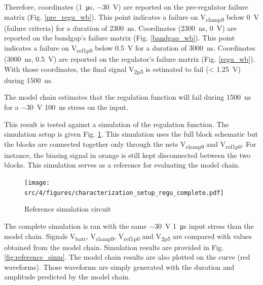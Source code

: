 Therefore, coordinates (\SI{1}{\micro\second}, \SI{-30}{\volt}) are reported on the pre-regulator failure matrix (Fig. \ref{pre_regu_wb}).
This point indicates a failure on V\textsubscript{clamp9} below \SI{0}{\volt} (failure criteria) for a duration of \SI{2300}{\nano\second}.
Coordinates (\SI{2300}{\nano\second}, \SI{0}{\volt}) are reported on the bandgap's failure matrix (Fig. \ref{bandgap_wb}).
This point indicates a failure on V\textsubscript{ref1p0} below \SI{0.5}{\volt} for a duration of \SI{3000}{\nano\second}.
Coordinates (\SI{3000}{\nano\second}, \SI{0.5}{\volt}) are reported on the regulator's failure matrix (Fig. \ref{regu_wb}).
With those coordinates, the final signal V\textsubscript{2p5} is estimated to fail (< \SI{1.25}{\volt}) during \SI{1500}{\nano\second}.

The model chain estimates that the regulation function will fail during \SI{1500}{\nano\second} for a \SI{-30}{\volt} \SI{100}{\nano\second} stress on the input.

This result is tested against a simulation of the regulation function.
The simulation setup is given Fig. \ref{fig:reference_simu_circuit}.
This simulation uses the full block schematic but the blocks are connected together only through the nets V\textsubscript{clamp9} and V\textsubscript{ref1p0}.
For instance, the biasing signal in orange is still kept disconnected between the two blocks.
This simulation serves as a reference for evaluating the model chain.

\begin{figure}[!h]
  \centering
  \texttt{[image: src/4/figures/characterization\_setup\_regu\_complete.pdf]}
  \caption{Reference simulation circuit}
  \label{fig:reference_simu_circuit}
\end{figure}

The complete simulation is ran with the same \SI{-30}{\volt} \SI{1}{\micro\second} input stress than the model chain.
Signals V\textsubscript{batt}, V\textsubscript{clamp9}, V\textsubscript{ref1p0} and V\textsubscript{2p5} are compared with values obtained from the model chain.
Simulation results are provided in Fig. \ref{fig:reference_simu}.
The model chain results are also plotted on the curve (red waveforms).
Those waveforms are simply generated with the duration and amplitude predicted by the model chain.


